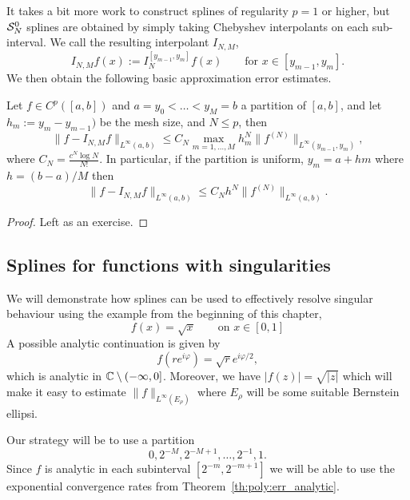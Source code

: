 It takes a bit more work to construct splines of regularity $p = 1$ or higher,
but $\mathcal{S}_N^0$ splines are obtained by simply taking Chebyshev interpolants on
each sub-interval. We call the resulting interpolant $I_{N,M}$, 
\[
    I_{N,M} f(x) := I_N^{[y_{m-1},y_m]} f(x)    \qquad \text{for }
    x \in [y_{m-1}, y_m].
\]
We then obtain the following basic approximation 
error estimates. 

\begin{theorem} \label{th:splines:convergence_Cj}
    Let $f \in C^p([a,b])$ and $a = y_0 < \dots < y_M = b$ a partition of $[a,
    b]$, and let $h_m := y_m - y_{m-1})$ be the mesh size, and $N \leq p$, then 
    \[
        \| f - I_{N,M} f \|_{L^\infty(a,b)}
        \leq  C_N \max_{m = 1, \dots, M} h_m^N
        \| f^{(N)} \|_{L^\infty(y_{m-1}, y_m)},
    \]
    where $C_N = \frac{c^N \log N}{N!}$.
    In particular, if the partition is uniform, 
    $y_m = a + h m$ where $h = (b-a)/M$ then 
    \[
        \| f - I_{N,M} f \|_{L^\infty(a,b)}
        \leq C_N h^N \|f^{(N)}\|_{L^\infty(a,b)}.
    \]
\end{theorem}
\begin{proof}
    Left as an exercise. 
\end{proof}


\subsection{Splines for functions with singularities}
%
\label{sec:splines:sing}
%
We will demonstrate how splines can be used to effectively resolve singular
behaviour using the example from the beginning of this chapter, 
\[ 
    f(x) = \sqrt{x} \qquad \text{on } x \in [0, 1]
\]
A possible analytic continuation is given by 
\[
    f(r e^{i \varphi}) = \sqrt{r} e^{i \varphi / 2},
\]
which is analytic in $\mathbb{C} \setminus (-\infty, 0]$. Moreover, we have $|f(z)| =
\sqrt{|z|}$ which will make it easy to estimate $\|f\|_{L^\infty(E_\rho)}$ where
$E_\rho$ will be some suitable Bernstein ellipsi.

Our strategy will be to use a partition  
\[
    0, 2^{-M}, 2^{-M+1}, \dots, 2^{-1}, 1.
\]
Since $f$ is analytic in each subinterval $[2^{-m}, 2^{-m+1}]$ we will be able
to use the exponential convergence rates from
Theorem~\ref{th:poly:err_analytic}.

